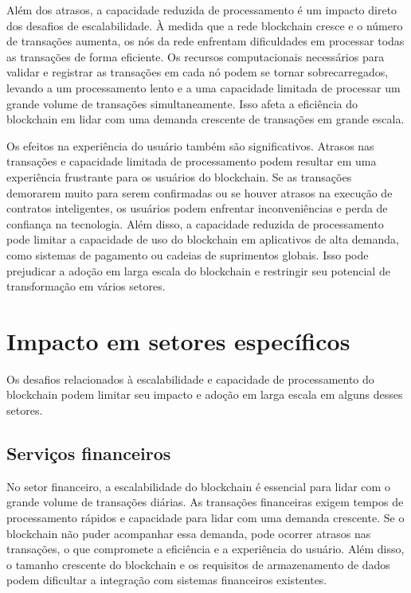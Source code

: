 Além dos atrasos, a capacidade reduzida de processamento é um impacto direto dos desafios de escalabilidade. À medida que a rede blockchain cresce e o número de transações aumenta, os nós da rede enfrentam dificuldades em processar todas as transações de forma eficiente. Os recursos computacionais necessários para validar e registrar as transações em cada nó podem se tornar sobrecarregados, levando a um processamento lento e a uma capacidade limitada de processar um grande volume de transações simultaneamente. Isso afeta a eficiência do blockchain em lidar com uma demanda crescente de transações em grande escala.

Os efeitos na experiência do usuário também são significativos. Atrasos nas transações e capacidade limitada de processamento podem resultar em uma experiência frustrante para os usuários do blockchain. Se as transações demorarem muito para serem confirmadas ou se houver atrasos na execução de contratos inteligentes, os usuários podem enfrentar inconveniências e perda de confiança na tecnologia. Além disso, a capacidade reduzida de processamento pode limitar a capacidade de uso do blockchain em aplicativos de alta demanda, como sistemas de pagamento ou cadeias de suprimentos globais. Isso pode prejudicar a adoção em larga escala do blockchain e restringir seu potencial de transformação em vários setores.


\section{Impacto em setores específicos}

 Os desafios relacionados à escalabilidade e capacidade de processamento do blockchain podem limitar seu impacto e adoção em larga escala em alguns desses setores.

\subsection{Serviços financeiros}

No setor financeiro, a escalabilidade do blockchain é essencial para lidar com o grande volume de transações diárias. As transações financeiras exigem tempos de processamento rápidos e capacidade para lidar com uma demanda crescente. Se o blockchain não puder acompanhar essa demanda, pode ocorrer atrasos nas transações, o que compromete a eficiência e a experiência do usuário. Além disso, o tamanho crescente do blockchain e os requisitos de armazenamento de dados podem dificultar a integração com sistemas financeiros existentes.

